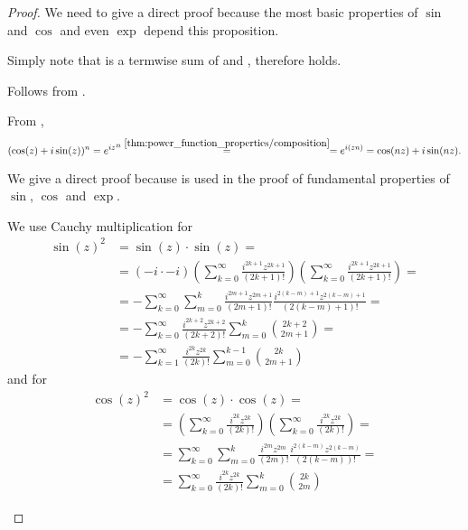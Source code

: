 \begin{proof}
  We need to give a direct proof because the most basic properties of \( \sin \) and \( \cos \) and even \( \exp \) depend this proposition.

  \begin{description}
     Simply note that  is a termwise sum of  and , therefore  holds.

     Follows from .

     From ,
    \begin{equation*}
      (\cos(z) + i \sin(z))^n
      =
      {e^{iz}}^n
      \overset {\ref{thm:power_function_properties/composition}} {=}
      =
      e^{i(zn)}
      =
      \cos(nz) + i \sin(nz).
    \end{equation*}

     We give a direct proof because  is used in the proof of fundamental properties of \( \sin \), \( \cos \) and \( \exp \).

    We use Cauchy multiplication for
    \begin{align*}
      \sin(z)^2
      &=
      \sin(z) \cdot \sin(z)
      = \\ &=
      (-i \cdot -i) \left( \sum_{k=0}^\infty \frac {i^{2k+1} z^{2k+1}} {(2k+1)!} \right) \left( \sum_{k=0}^\infty \frac {i^{2k+1} z^{2k+1}} {(2k+1)!} \right)
      = \\ &=
      -\sum_{k=0}^\infty \sum_{m=0}^k \frac {i^{2m+1} z^{2m+1}} {(2m+1)!} \frac {i^{2(k-m)+1} z^{2(k-m)+1}} {(2(k-m)+1)!}
      = \\ &=
      -\sum_{k=0}^\infty \frac {i^{2k+2} z^{2k+2}} {(2k+2)!} \sum_{m=0}^k \binom {2k+2} {2m+1}
      = \\ &=
      -\sum_{k=1}^\infty \frac {i^{2k} z^{2k}} {(2k)!} \sum_{m=0}^{k-1} \binom {2k} {2m+1}
    \end{align*}
    and for
    \begin{align*}
      \cos(z)^2
      &=
      \cos(z) \cdot \cos(z)
      = \\ &=
      \left( \sum_{k=0}^\infty \frac {i^{2k} z^{2k}} {(2k)!} \right) \left( \sum_{k=0}^\infty \frac {i^{2k} z^{2k}} {(2k)!} \right)
      = \\ &=
      \sum_{k=0}^\infty \sum_{m=0}^k \frac {i^{2m} z^{2m}} {(2m)!} \frac {i^{2(k-m)} z^{2(k-m)}} {(2(k-m))!}
      = \\ &=
      \sum_{k=0}^\infty \frac {i^{2k} z^{2k}} {(2k)!} \sum_{m=0}^k \binom {2k} {2m}
    \end{align*}


\end{description}
\end{proof}
